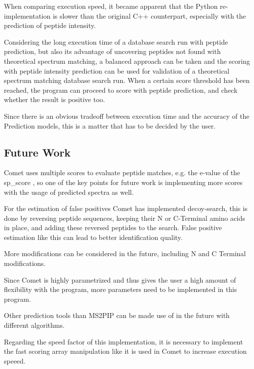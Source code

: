\documentclass[11pt]{article}
\begin{document}
When comparing execution speed, it became apparent that the Python re-implementation is slower than the original C++ counterpart, especially with the prediction of peptide intensity. 

Considering the long execution time of a database search run with peptide prediction, but also its advantage of uncovering peptides not found with theoretical spectrum matching, a balanced approach can be taken and the scoring with peptide intensity prediction can be used for validation of a theoretical spectrum matching database search run. When a certain score threshold has been reached, the program can proceed to score with peptide prediction, and check whether the result is positive too.

Since there is an obvious tradeoff between execution time and the accuracy of the Prediction models, this is a matter that has to be decided by the user.

\subsection{Future Work}

Comet uses multiple scores to evaluate peptide matches, e.g. the e-value of the sp\_score , so one of the key points for future work is implementing more scores with the usage of predicted spectra as well.

For the estimation of false positives Comet has implemented decoy-search, this is done by reversing peptide sequences, keeping their N or C-Terminal amino acids in place, and adding these reversed peptides to the search. False positive estimation like this can lead to better identification quality.

More modifications can be considered in the future, including N and C Terminal modifications.

Since Comet is highly parametrized and thus gives the user a high amount of flexibility with the program, more parameters need to be implemented in this program.

Other prediction tools than MS2PIP can be made use of in the future with different algorithms.

Regarding the speed factor of this implementation, it is necessary to implement the fast scoring array manipulation like it is used in Comet to increase execution speeed. 
\end{document}
